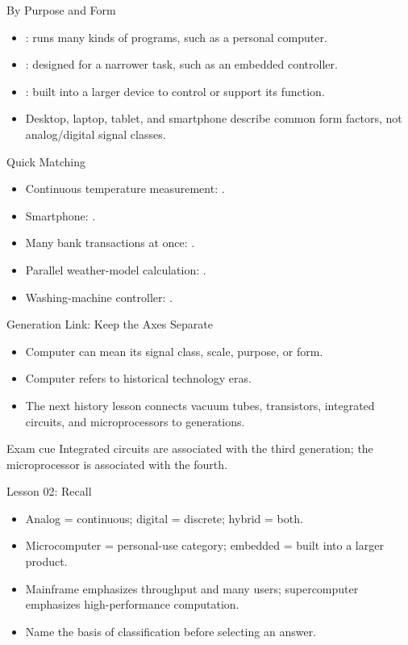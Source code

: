 \documentclass[aspectratio=169]{beamer}
\begin{document}
\begin{frame}{By Purpose and Form}
  \begin{itemize}
    \item {}: runs many kinds of programs, such as a
      personal computer.
    \item {}: designed for a narrower task, such as an
      embedded controller.
    \item {}: built into a larger device to control or
      support its function.
    \item Desktop, laptop, tablet, and smartphone describe common form factors,
      not analog/digital signal classes.
  \end{itemize}
\end{frame}

\begin{frame}{Quick Matching}
  \begin{itemize}
    \item Continuous temperature measurement: .
    \item Smartphone: .
    \item Many bank transactions at once: .
    \item Parallel weather-model calculation: .
    \item Washing-machine controller: .
  \end{itemize}
\end{frame}

\begin{frame}{Generation Link: Keep the Axes Separate}
  \begin{itemize}
    \item Computer  can mean its signal class, scale, purpose, or
      form.
    \item Computer  refers to historical technology eras.
    \item The next history lesson connects vacuum tubes, transistors,
      integrated circuits, and microprocessors to generations.
  \end{itemize}
  \begin{block}{Exam cue}
    Integrated circuits are associated with the third generation; the
    microprocessor is associated with the fourth.
  \end{block}
\end{frame}

\begin{frame}{Lesson 02: Recall}
  \begin{itemize}
    \item Analog = continuous; digital = discrete; hybrid = both.
    \item Microcomputer = personal-use category; embedded = built into a
      larger product.
    \item Mainframe emphasizes throughput and many users; supercomputer
      emphasizes high-performance computation.
    \item Name the basis of classification before selecting an answer.
  \end{itemize}
\end{frame}
\end{document}
